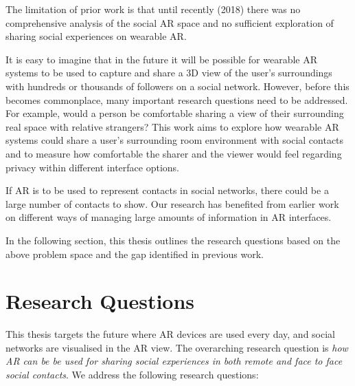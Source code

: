 The limitation of prior work is that until recently (2018) there was no comprehensive analysis of the social AR space and no sufficient exploration of sharing social experiences on wearable AR. 

It is easy to imagine that in the future it will be possible for wearable AR systems to be used to capture and share a 3D view of the user's surroundings with hundreds or thousands of followers on a social network. However, before this becomes commonplace, many important research questions need to be addressed. For example, would a person be comfortable sharing a view of their surrounding real space with relative strangers? This work aims to explore how wearable AR systems could share a user’s surrounding room environment with social contacts and to measure how comfortable the sharer and the viewer would feel regarding privacy within different interface options. 

If AR is to be used to represent contacts in social networks, there could be a large number of contacts to show. Our research has benefited from earlier work on different ways of managing large amounts of information in AR interfaces.

In the following section, this thesis outlines the research questions based on the above problem space and the gap identified in previous work.

\section{Research Questions}

This thesis targets the future where AR devices are used every day, and social networks are visualised in the AR view. The overarching research question is \textit{how AR can be be used for sharing social experiences in both remote and face to face social contacts}. We address the following research questions: 

